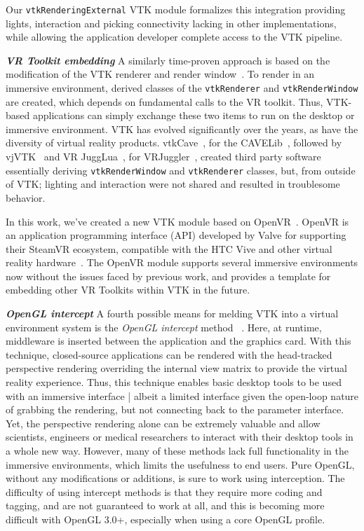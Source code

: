 Our \texttt{vtkRenderingExternal} VTK module formalizes this integration providing lights, interaction and picking connectivity lacking in other implementations, while allowing the application developer complete access to the VTK pipeline.

\textbf{\textit{VR Toolkit embedding}} A similarly time-proven approach is based on the modification of the VTK renderer and render window~\cite{van2000vista, Hannema:2001, Shamonin02vtkcave, Belleman:2003}.
To render in an immersive environment, derived classes of the
\texttt{vtkRenderer} and \texttt{vtkRenderWindow} are created, which depends on fundamental calls to the VR toolkit.
Thus, VTK-based applications can simply exchange these two items to run on the desktop or immersive environment.
VTK has evolved significantly over the years, as have the diversity of virtual reality products.
vtkCave~\cite{Tufo:1999}, for the CAVELib~\cite{CAVELib:2016}, followed by
vjVTK~\cite{Blom:2006} and VR JuggLua~\cite{Pavlik:2012}, for
VRJuggler~\cite{Bierbaum:2001}, created third party software essentially
deriving \texttt{vtkRenderWindow} and \texttt{vtkRenderer} classes, but, from
outside of VTK; lighting and interaction were not shared and resulted in troublesome behavior.

In this work, we've created a new VTK module based on OpenVR~\cite{OpenVR:2016}.
OpenVR is an application programming interface (API) developed by Valve for supporting their SteamVR ecosystem, compatible with the HTC Vive and other virtual reality hardware~\cite{Road2VR:2015}.
The OpenVR module supports several immersive environments now without the issues faced by previous work, and provides a template for embedding other VR Toolkits within VTK in the future.

\textit{\textbf{OpenGL intercept}}
A fourth possible means for melding VTK into a virtual environment system
is the \textit{OpenGL intercept} method
~\cite{Humphreys:2001,Humphreys:2002,Zielinski:2014,TechViz:2016,Conduit:2016}.
Here, at runtime, middleware is inserted between the application and the graphics card.
With this technique, closed-source applications can be rendered with
the head-tracked perspective rendering overriding the internal view matrix
to provide the virtual reality experience.
Thus, this technique enables basic desktop tools to be used with an
immersive interface | albeit a limited interface given the open-loop nature of
grabbing the rendering, but not connecting back to the parameter interface.
Yet, the perspective rendering alone can be extremely valuable and allow
scientists, engineers or medical researchers to interact with their desktop
tools in a whole new way. However, many of these methods lack full functionality in the immersive environments, which limits the usefulness to end users.
Pure OpenGL, without any modifications or additions,  is sure to work using interception.
The difficulty of using intercept methods is that they require more coding
and tagging, and are not guaranteed to work at all, and this is becoming
more difficult with OpenGL 3.0+, especially when using a core OpenGL profile.

